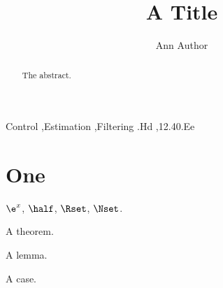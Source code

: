 \documentclass{autart}
\begin{document}
\begin{frontmatter}
\title{A Title}
\author{Ann Author}
\address{Some University}
\begin{abstract}The abstract.\end{abstract}
\begin{keyword}
Control \sep Estimation \sep Filtering
.Hd \sep 12.40.Ee
\end{keyword}
\end{frontmatter}
\section{One}
$\e^{x}$, $\half$, $\Rset$, $\Nset$.
\begin{thm}A theorem.\end{thm}
\begin{lem}A lemma.\end{lem}
\begin{case}A case.\end{case}
\end{document}
